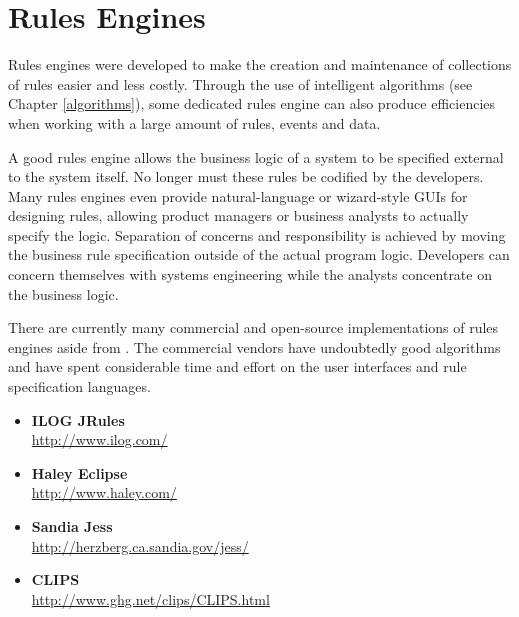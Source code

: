 \section{Rules Engines}

Rules engines were developed to make the creation and maintenance
of collections of rules easier and less costly.
Through the use of intelligent
algorithms (see Chapter \vref{algorithms}), some dedicated rules engine
can also produce efficiencies when working with a large amount of
rules, events and data.

A good rules engine allows the business logic of a system
to be specified external to the system itself.  No longer must these
rules be codified by the developers.  Many rules engines even provide
natural-language or wizard-style GUIs for designing rules, allowing
product managers or business analysts to actually specify the logic.
Separation of concerns and responsibility is achieved by moving the 
business rule specification outside of the actual program logic.
Developers can
concern themselves with systems engineering while the analysts 
concentrate on the business logic.

There are currently many commercial and open-source implementations
of rules engines aside from \drools{}.  The commercial
vendors have undoubtedly good algorithms and have spent considerable
time and effort on the user interfaces and rule specification
languages.

\begin{itemize}
	\item \textbf{\textsf{ILOG JRules}}\\
		 \url{http://www.ilog.com/}
	\item \textbf{\textsf{Haley Eclipse}}\\
		 \url{http://www.haley.com/}
	\item \textbf{\textsf{Sandia Jess}}\\
		 \url{http://herzberg.ca.sandia.gov/jess/}
	\item \textbf{\textsf{CLIPS}}\\
		 \url{http://www.ghg.net/clips/CLIPS.html}
\end{itemize}


